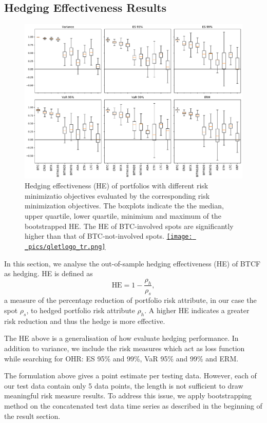 \subsection{Hedging Effectiveness Results}\label{sec: HE results}
\begin{figure}[t]
\includegraphics[width=\textwidth]{_pics/ES5_HE_boxplot.pdf}
  \caption{Hedging effectiveness (HE) of portfolios with different risk minimizatio objectives evaluated by the corresponding risk minimization objectives.
            The boxplots indicate the the median, upper quartile, lower quartile, minimium and maximum of the bootstrapped HE.
            The HE of BTC-involved spots are significantly higher than that of BTC-not-involved spots.
  \href{http://www.quantlet.com/}{\texttt{[image: \_pics/qletlogo\_tr.png]}} }
\label{fig:HEboxplot}
\end{figure}
In this section, we analyse the out-of-sample hedging effectiveness (HE) of BTCF as hedging.
HE is defined as $$\text{HE} = 1-\frac{\rho_h}{\rho_s},$$
a measure of the percentage reduction of portfolio risk attribute, in our case the spot $\rho_s$,
to hedged portfolio risk attribute $\rho_h$.
A higher HE indicates a greater risk reduction and thus the hedge is more effective. \medskip

The HE above is a generalisation of how \citet{ederington1979hedging} evaluate hedging performance.
In addition to variance, we include the risk measures which act as loss function while searching for OHR: ES 95\% and 99\%, VaR 95\% and 99\% and ERM. \medskip

The formulation above gives a point estimate per testing data.
However, each of our test data contain only 5 data points, the length is not sufficient to draw meaningful risk measure results.
To address this issue, we apply bootstrapping method on the concatenated test data time series as described in the beginning of the result section. \medskip

